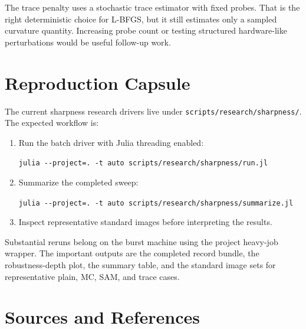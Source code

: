 \documentclass[11pt]{article}
\begin{document}
The trace penalty uses a stochastic trace estimator with fixed probes. That is
the right deterministic choice for L-BFGS, but it still estimates only a
sampled curvature quantity. Increasing probe count or testing structured
hardware-like perturbations would be useful follow-up work.

\section{Reproduction Capsule}

The current sharpness research drivers live under
\texttt{scripts/research/sharpness/}. The expected workflow is:

\begin{enumerate}
    \item Run the batch driver with Julia threading enabled:
    \begin{center}
    \texttt{julia -{}-project=. -t auto scripts/research/sharpness/run.jl}
    \end{center}
    \item Summarize the completed sweep:
    \begin{center}
    \texttt{julia -{}-project=. -t auto scripts/research/sharpness/summarize.jl}
    \end{center}
    \item Inspect representative standard images before interpreting the
    results.
\end{enumerate}

Substantial reruns belong on the burst machine using the project heavy-job
wrapper. The important outputs are the completed record bundle, the
robustness-depth plot, the summary table, and the standard image sets for
representative plain, MC, SAM, and trace cases.

\section{Sources and References}
\end{document}

